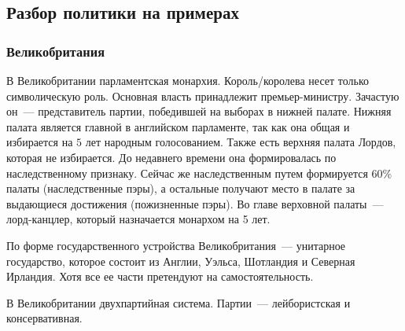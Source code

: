 \documentclass[12pt]{article}
\begin{document}
	\subsection{Разбор политики на примерах}
	\subsubsection{Великобритания}
	\begin{note}
		В Великобритании парламентская монархия. Король/королева несет только символическую роль. Основная власть принадлежит премьер-министру. Зачастую он~--- представитель партии, победившей на выборах в нижней палате. Нижняя палата является главной в английском парламенте, так как она общая и избирается на $5$ лет народным голосованием. Также есть верхняя палата Лордов, которая не избирается. До недавнего времени она формировалась по наследственному признаку. Сейчас же наследственным путем формируется $60\%$ палаты (наследственные пэры), а остальные получают место в палате за выдающиеся достижения (пожизненные пэры). Во главе верховной палаты~--- лорд-канцлер, который назначается монархом на 5 лет.
	\end{note}
	\begin{note}
		По форме государственного устройства Великобритания~--- унитарное государство, которое состоит из Англии, Уэльса, Шотландия и Северная Ирландия. Хотя все ее части претендуют на самостоятельность.
	\end{note}
	\begin{note}
		В Великобритании двухпартийная система. Партии~--- лейбористская и консервативная.
	\end{note}
\end{document}
